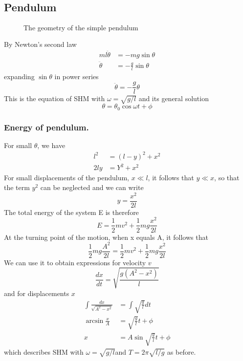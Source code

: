 \documentclass[../../../main.tex]{subfiles}
\begin{document}
\subsection{Pendulum}
\begin{figure}[b]
    \centering
    \caption*{The geometry of the simple pendulum}
\end{figure}
By Newton's second law 
\begin{align*}
    ml\ddot{\theta}&=-mg\sin\theta\\
\ddot{\theta}&=-\frac{g}{l}\sin \theta
\end{align*}
expanding $\sin\theta $ in power series
\begin{equation*}
    \ddot{\theta}=-\frac{g}{l}\theta
\end{equation*}
This is the equation of SHM with $ \omega=\sqrt{g/ l}$ and its general solution 
\begin{equation*}
    \theta=\theta_0 \cos \omega t +\phi
\end{equation*}

\subsubsection{Energy of pendulum.} For small $\theta$, we have
\begin{align*}
    l^2& = (l - y)^2 + x^2\\
    2ly&=Y^2+x^2
\end{align*}
For small displacements of the pendulum, $x\ll l $, it follows that $ y \ll x$, so that the term $y^2$ can be neglected and we can write
\begin{equation*}
    y=\frac{x^2}{2l}
\end{equation*}
The total energy of the system E is therefore\begin{equation*}
    E=\frac{1}{2}mv^2+\frac{1}{2}mg\frac{x^2}{2l}
\end{equation*}
At the turning point of the motion, when x equals A, it follows that
\begin{equation*}
    \frac{1}{2}mg\frac{A^2}{2l}=\frac{1}{2}mv^2+\frac{1}{2}mg\frac{x^2}{2l}
\end{equation*}
We can use it to obtain expressions for velocity $v$ 
\begin{equation*}
    \frac{dx}{dt}=\sqrt{\frac{g(A^2-x^2)}{l}}
\end{equation*}
and for displacements $x$
\begin{align*}
    \int \frac{dx}{\sqrt{A^2-x^2}}&=\int \sqrt{\frac{g}{l}}dt\\
    \arcsin \frac{x}{A}&= \sqrt{\frac{g}{l}}t+\phi\\
    x&=A\sin \sqrt{\frac{g}{l}}t+\phi
\end{align*}
which describes SHM with $\omega = \sqrt{g/ l} $and $T = 2\pi \sqrt{l/g}$ as before.
\end{document}
